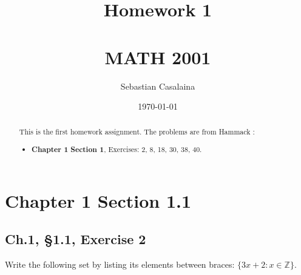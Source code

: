 \documentclass[12pt]{amsart}
\numberwithin{equation}{section}
\theoremstyle{definition}
\theoremstyle{remark}
\begin{document}




\author[Casalaina]{Sebastian Casalaina}
\address{University of Colorado, Department of Mathematics,  Campus Box 395,
Boulder, CO 80309-0395}
\date{\today}



\title[Homework 1]{Homework 1 \\ \ \\  MATH 2001}

\begin{abstract} 
This is the first homework assignment.  The problems are from Hammack \cite[Ch.~1, \S 1.1]{H13}:
\begin{itemize}

\item \textbf{Chapter 1}  
\textbf{Section 1}, Exercises:  2, 8, 18, 30, 38, 40.

\end{itemize}
\end{abstract}


\maketitle


\tableofcontents





\section*{Chapter 1 Section 1.1}



\subsection*{Ch.1, \S 1.1,  Exercise 2}  Write the following set by listing its elements between braces: $\{3x+2:x\in \mathbb Z\}$.   
\end{document}
